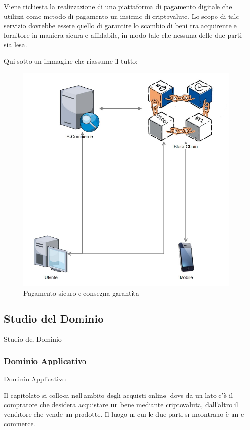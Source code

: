 \documentclass[11pt]{article}
\begin{document}
    Viene richiesta la realizzazione di una piattaforma di pagamento digitale che utilizzi come metodo di pagamento un insieme di criptovalute. Lo scopo di tale servizio dovrebbe essere quello di garantire lo scambio di beni tra acquirente e fornitore in maniera sicura e affidabile, in modo tale che nessuna delle due parti sia lesa.
    
    Qui sotto un immagine che riassume il tutto:
    
    \begin{figure}[h!]
        \centering
        \includegraphics[scale=0.4]{Res/SyncLab.png}
        \caption{Pagamento sicuro e consegna garantita}
        \label{SyncLab}
    \end{figure}
    
    \subsection{Studio del Dominio} Studio del Dominio
        \subsubsection{Dominio Applicativo} Dominio Applicativo
        
        Il capitolato si colloca nell’ambito degli acquisti online, dove da un lato c’è il compratore che desidera acquistare un bene mediante criptovaluta, dall’altro il venditore che vende un prodotto. Il luogo in cui le due parti si incontrano è un e-commerce.
\end{document}
